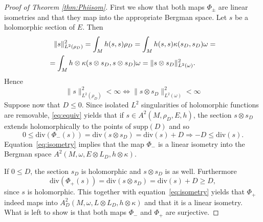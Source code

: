 \documentclass[11pt]{amsart}
\theoremstyle{definition}
\begin{document}
\begin{proof}[Proof of Theorem \ref{thm:Phiisom}] First we show that both maps $\Phi_{\pm}$ are linear isometries and that they map into the appropriate Bergman space.
 Let $s$ be a holomorphic section of $E$. Then  
\begin{equation}\label{eq:isometry}
\begin{split}
\|s\|^2_{L^2(\rho_D)}=\int_Mh(s,s)\rho_D=
\int_M h(s,s)\kappa(s_D,s_D)\omega=\\  =\int_M h\otimes \kappa(s\otimes s_D,s\otimes s_D)\omega=
\|s\otimes s_D\|^2_{L^2(\omega)}.\hspace{10mm}
\end{split}   
\end{equation} 
Hence
\begin{equation}\label{eq:equiv}
\|s\|^2_{L^2(\rho_D)}<\infty\Longleftrightarrow
\|s\otimes s_D\|^2_{L^2(\omega)}<\infty
\end{equation}
Suppose now that $D\le 0$.
 Since isolated $L^2$ singularities of holomorphic functions are removable, \eqref{eq:equiv} yields  that if $s\in  A^2(M,\rho_D,E,h)$, the section $s\otimes s_D$ extends holomorphically to the points of $\text{supp}(D)$ and so
 \begin{equation}\label{E:D<0}
 0\le \text{div}(\Phi_-(s))= \text{div}(s\otimes s_D)=\text{div}(s)+D\Longrightarrow
 -D\le \text{div}(s).
\end{equation}
 Equation~\eqref{eq:isometry} implies that the map $\Phi_-$   is a  linear isometry into the Bergman space $A^2(M,\omega,E\otimes L_D, h\otimes\kappa)$. 
 
 
 If $0\le D$, the section $s_D$ is holomorphic
 and $s\otimes s_D$ is as well.
 Furthermore 
 $$\text{div}(\Phi_+(s))=\text{div}(s\otimes s_D)=\text{div} (s)+D\ge D,$$
 since $s$ is holomorphic. This together with
 equation~\eqref{eq:isometry}
yields that $\Phi_+$ indeed maps into  $A^2_D(M,\omega,L\otimes L_D, h\otimes\kappa)$ and that it is a linear isometry.
What is left  to show is that both maps $\Phi_-$ and $\Phi_+$ are surjective. 


\end{proof}
\end{document}
